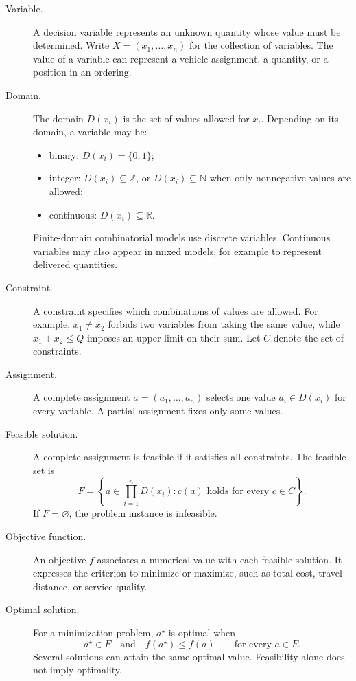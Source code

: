 \begin{description}
\item[Variable.] A decision variable represents an unknown quantity whose value
must be determined. Write $X=(x_1,\ldots,x_n)$ for the collection of variables.
The value of a variable can represent a vehicle assignment, a quantity, or a
position in an ordering.

\item[Domain.] The domain $D(x_i)$ is the set of values allowed for $x_i$.
Depending on its domain, a variable may be:
\begin{itemize}
 \item binary: $D(x_i)=\{0,1\}$;
 \item integer: $D(x_i)\subseteq\mathbb{Z}$, or
       $D(x_i)\subseteq\mathbb{N}$ when only nonnegative values are allowed;
 \item continuous: $D(x_i)\subseteq\mathbb{R}$.
\end{itemize}
Finite-domain combinatorial models use discrete variables. Continuous variables
may also appear in mixed models, for example to represent delivered quantities.

\item[Constraint.] A constraint specifies which combinations of values are
allowed. For example, $x_1\neq x_2$ forbids two variables from taking the same
value, while $x_1+x_2\leq Q$ imposes an upper limit on their sum. Let $C$ denote
the set of constraints.

\item[Assignment.] A complete assignment $a=(a_1,\ldots,a_n)$ selects one value
$a_i\in D(x_i)$ for every variable. A partial assignment fixes only some values.

\item[Feasible solution.] A complete assignment is feasible if it satisfies
all constraints. The feasible set is
\[
 F=\left\{a\in\prod_{i=1}^{n}D(x_i): c(a)\text{ holds for every }c\in C\right\}.
\]
If $F=\varnothing$, the problem instance is infeasible.

\item[Objective function.] An objective $f$ associates a numerical value with
each feasible solution. It expresses the criterion to minimize or maximize,
such as total cost, travel distance, or service quality.

\item[Optimal solution.] For a minimization problem, $a^\star$ is optimal when
\[
 a^\star\in F\quad\text{and}\quad
 f(a^\star)\leq f(a)\qquad\text{for every }a\in F.
\]
Several solutions can attain the same optimal value. Feasibility alone does
not imply optimality.
\end{description}


